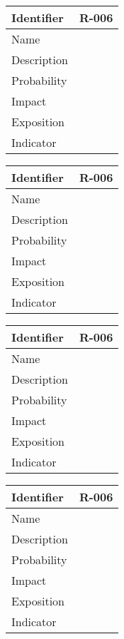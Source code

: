 \begin{table}[H]
	\begin{tabularx}{\textwidth}{|l|X|}
		\hline
		\rowcolor{gray!30}
		Identifier & \textbf{R-006} \\ \hline
		Name & \\ \hline
		Description & \\ \hline
		Probability & \\ \hline
		Impact &  \\ \hline
		Exposition &  \\ \hline
		Indicator & \\ \hline
	\end{tabularx}
\end{table}
\begin{table}[H]
	\begin{tabularx}{\textwidth}{|l|X|}
		\hline
		\rowcolor{gray!30}
		Identifier & \textbf{R-006} \\ \hline
		Name & \\ \hline
		Description & \\ \hline
		Probability & \\ \hline
		Impact &  \\ \hline
		Exposition &  \\ \hline
		Indicator & \\ \hline
	\end{tabularx}
\end{table}
\begin{table}[H]
	\begin{tabularx}{\textwidth}{|l|X|}
		\hline
		\rowcolor{gray!30}
		Identifier & \textbf{R-006} \\ \hline
		Name & \\ \hline
		Description & \\ \hline
		Probability & \\ \hline
		Impact &  \\ \hline
		Exposition &  \\ \hline
		Indicator & \\ \hline
	\end{tabularx}
\end{table}
\begin{table}[H]
	\begin{tabularx}{\textwidth}{|l|X|}
		\hline
		\rowcolor{gray!30}
		Identifier & \textbf{R-006} \\ \hline
		Name & \\ \hline
		Description & \\ \hline
		Probability & \\ \hline
		Impact &  \\ \hline
		Exposition &  \\ \hline
		Indicator & \\ \hline
	\end{tabularx}
\end{table}
